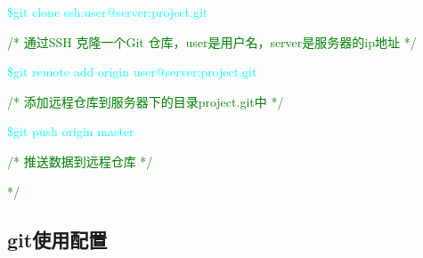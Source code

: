 \begin{enumerate}
\textcolor{cyan}{\$git clone ssh:user@server:project.git}

\textcolor{green}{/* 通过SSH 克隆一个Git 仓库，user是用户名，server是服务器的ip地址 */}

\textcolor{cyan}{\$git remote add origin  user@server:project.git}

\textcolor{green}{/* 添加远程仓库到服务器下的目录project.git中 */}

\textcolor{cyan}{\$git push  origin master}

\textcolor{green}{/* 推送数据到远程仓库 */}

\textcolor{green}{ */}
 
\end{enumerate}

\subsection{git使用配置}

